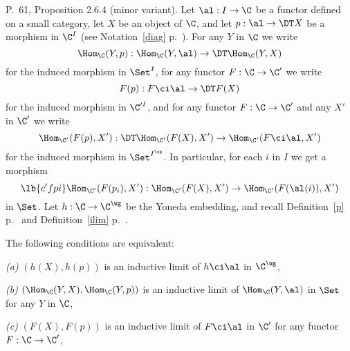 \documentclass[12pt]{article}
\theoremstyle{remark}
\theoremstyle{definition}
\begin{document}
\begin{s} 
P.~61, Proposition 2.6.4 (minor variant). Let $\al:I\to\C$ be a functor defined on a small category, let $X$ be an object of $\C$, and let $p:\al\to\DT X$ be a morphism in $\C^I$ (see Notation~\ref{diag} p.~). For any $Y$ in $\C$ we write 
$$
\Hom_\C(Y,p):\Hom_\C(Y,\al)\to\DT\Hom_\C(Y,X)
$$ 
for the induced morphism in $\Set^I$, for any functor $F:\C\to\C'$ we write 
$$
F(p):F\ci\al\to\DT F(X)
$$ 
for the induced morphism in $\C'^I$, and for any functor $F:\C\to\C'$ and any $X'$ in $\C'$ we write 
$$
\Hom_{\C'}(F(p),X'):\DT\Hom_{\C'}(F(X),X')\to\Hom_{\C'}(F\ci\al,X')
$$ 
for the induced morphism in $\Set^{I^{\op}}$. In particular, for each $i$ in $I$ we get a morphism 
\begin{equation}\lb{c'fpi}
\Hom_{\C'}(F(p_i),X'):\Hom_{\C'}(F(X),X')\to\Hom_{\C'}(F(\al(i)),X')
\end{equation}
in $\Set$. Let $h:\C\to\C^\wg$ be the Yoneda embedding, and recall Definition~\ref{p} p.~ and Definition~\ref{ilim} p.~.
%
\begin{prop}
The following conditions are equivalent:

\nn\emph{(a)} $(h(X),h(p))$ is an inductive limit of $h\ci\al$ in $\C^\wg$,

\nn\emph{(b)} $(\Hom_\C(Y,X),\Hom_\C(Y,p))$ is an inductive limit of $\Hom_\C(Y,\al)$ in $\Set$ for any $Y$ in $\C$,

\nn\emph{(c)} $(F(X),F(p))$ is an inductive limit of $F\ci\al$ in $\C'$ for any functor $F:\C\to\C'$,


\end{prop}
\end{s}
\end{document}
